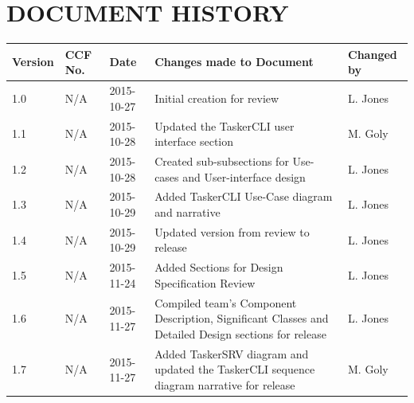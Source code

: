 \documentclass{project}
\begin{document}
\section*{DOCUMENT HISTORY}
\begin{tabular}{|l | l | l | p{8cm} |l | }
\hline
Version & CCF No. & Date & Changes made to Document & Changed by \\
\hline
1.0 & N/A & 2015-10-27 & Initial creation for review & L. Jones \\
\hline
1.1 & N/A & 2015-10-28 & Updated the TaskerCLI user interface section & M. Goly \\
\hline
1.2 & N/A & 2015-10-28 & Created sub-subsections for  Use-cases and User-interface design & L. Jones \\
\hline
1.3 & N/A & 2015-10-29 & Added TaskerCLI Use-Case diagram and narrative & L. Jones \\
\hline
1.4 & N/A & 2015-10-29 & Updated version from review to release & L. Jones \\
\hline
1.5 & N/A & 2015-11-24 & Added Sections for Design Specification Review & L. Jones \\
\hline
1.6 & N/A & 2015-11-27 & Compiled team's  Component Description, Significant Classes and Detailed Design sections for release & L. Jones \\
\hline
1.7 & N/A & 2015-11-27 & Added TaskerSRV diagram and updated the TaskerCLI sequence diagram narrative for release & M. Goly \\
\hline
\end{tabular}
\label{thelastpage}
\end{document}

